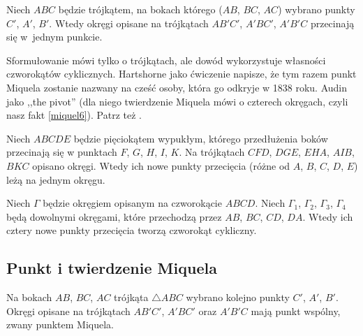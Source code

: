 \begin{proposition}
	Niech $ABC$ będzie trójkątem, na bokach którego ($AB$, $BC$, $AC$) wybrano punkty $C'$, $A'$, $B'$.
	Wtedy okręgi opisane na trójkątach $AB'C'$, $A'BC'$, $A'B'C$ przecinają się w~jednym punkcie.
\end{proposition}

Sformułowanie mówi tylko o trójkątach, ale dowód wykorzystuje własności czworokątów cyklicznych.
Hartshorne jako ćwiczenie \cite[s. 61]{hartshorne2000} napisze, że tym razem punkt Miquela zostanie nazwany na cześć osoby, która go odkryje w 1838 roku.
%
Audin \cite[s. 104]{audin_2003} jako ,,the pivot'' (dla niego twierdzenie Miquela mówi o czterech okręgach, czyli nasz fakt \ref{miquel6}).
Patrz też \cite[s. 11]{komisarczyk_2024}.

\begin{proposition}
	Niech $ABCDE$ będzie pięciokątem wypukłym, którego przedłużenia boków przecinają się w punktach $F$, $G$, $H$, $I$, $K$.
	Na trójkątach $CFD$, $DGE$, $EHA$, $AIB$, $BKC$ opisano okręgi.
	Wtedy ich nowe punkty przecięcia (różne od $A$, $B$, $C$, $D$, $E$) leżą na jednym okręgu. 
\end{proposition}


\begin{proposition}
\label{miquel6}%
	Niech $\Gamma$ będzie okręgiem opisanym na czworokącie $ABCD$.
	Niech $\Gamma_1$, $\Gamma_2$, $\Gamma_3$, $\Gamma_4$ będą dowolnymi okręgami, które przechodzą przez $AB$, $BC$, $CD$, $DA$.
	Wtedy ich cztery nowe punkty przecięcia tworzą czworokąt cykliczny.
\end{proposition}

\subsection{Punkt i twierdzenie Miquela}
\begin{proposition}
	Na bokach $AB$, $BC$, $AC$ trójkąta $\triangle ABC$ wybrano kolejno punkty $C'$, $A'$, $B'$.
	Okręgi opisane na trójkątach $AB'C'$, $A'BC'$ oraz $A'B'C$ mają punkt wspólny, zwany punktem Miquela.
\end{proposition}

